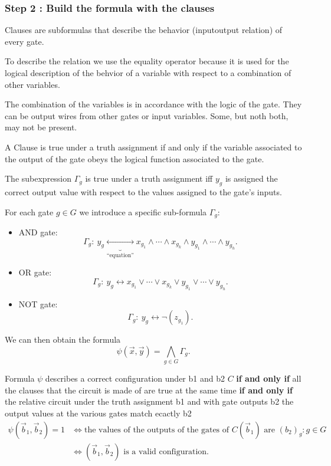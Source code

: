 \subsubsection{Step 2 : Build the formula with the clauses}
Clauses are subformulas that describe the behavior (input\-output relation) of every gate. 

To describe the relation we use the equality operator because it is used for the logical description of the behvior of a variable with respect to a combination of other variables.

The combination of the variables is in accordance with the logic of the gate. They can be output wires from other gates or input variables. Some, but noth both, may not be present.  

A Clause is true under a truth assignment if and only if the variable associated to the output of the gate obeys the logical function associated to the gate. 

The subexpression $\Gamma_g$ is true under a truth assignment iff $y_g$ is assigned the correct output value with respect to the values assigned to the gate's inputs.

For each gate $g\in G$ we introduce a specific sub-formula $\Gamma_g$:
\begin{itemize}
\item AND gate:
\[
\Gamma_g:\ y_g\underbrace{\leftrightarrow}_{\text{``equation''}}x_{g_1}\land\cdots\land x_{g_k}\land y_{g_1}\land\cdots\land y_{g_h}.
\]
\item OR gate:
\[
\Gamma_g:\ y_g\leftrightarrow x_{g_1}\lor\cdots\lor x_{g_k}\lor y_{g_1}\lor\cdots\lor y_{g_h}.
\]
\item NOT gate:
\[\Gamma_g:\ y_g\leftrightarrow\neg(z_{g_1}).\]
\end{itemize}

We can then obtain the formula
\[\psi(\vec x,\vec y)=\bigwedge_{g\in G}\Gamma_g.\]

Formula $\psi$ describes a correct configuration under b1 and b2 $C$ \textbf{if and only if}  all the clauses that the circuit is made of  are true at the same time \textbf{if and only if} the relative circuit under the truth assignment b1 and with gate outputs b2 the output values at the various gates match ecactly b2 
\[
\begin{aligned}
\psi(\vec b_1,\vec b_2)=1
&\Longleftrightarrow\text{the values of the outputs of the gates of }C(\vec b_1)\text{ are }(b_2)_g:g\in G\\
&\Longleftrightarrow(\vec b_1,\vec b_2)\text{ is a valid configuration.}
\end{aligned}
\]
